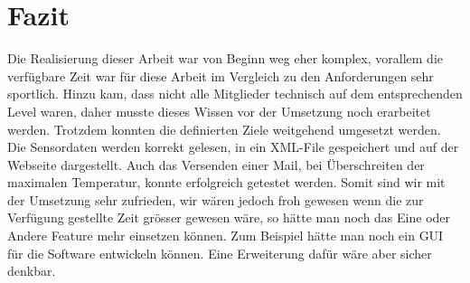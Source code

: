 \section{Fazit}
Die Realisierung dieser Arbeit war von Beginn weg eher komplex, vorallem die verfügbare Zeit war für diese Arbeit im Vergleich zu den Anforderungen sehr sportlich. Hinzu kam, dass nicht alle Mitglieder technisch auf dem entsprechenden Level waren, daher musste dieses Wissen vor der Umsetzung noch erarbeitet werden. Trotzdem konnten die definierten Ziele weitgehend umgesetzt werden. Die Sensordaten werden korrekt gelesen, in ein XML-File gespeichert und auf der Webseite dargestellt. Auch das Versenden einer Mail, bei Überschreiten der maximalen Temperatur, konnte erfolgreich getestet werden. Somit sind wir mit der Umsetzung sehr zufrieden, wir wären jedoch froh gewesen wenn die zur Verfügung gestellte Zeit grösser gewesen wäre, so hätte man noch das Eine oder Andere Feature mehr einsetzen können. Zum Beispiel hätte man noch ein GUI für die Software entwickeln können. Eine Erweiterung dafür wäre aber sicher denkbar.
\newpage